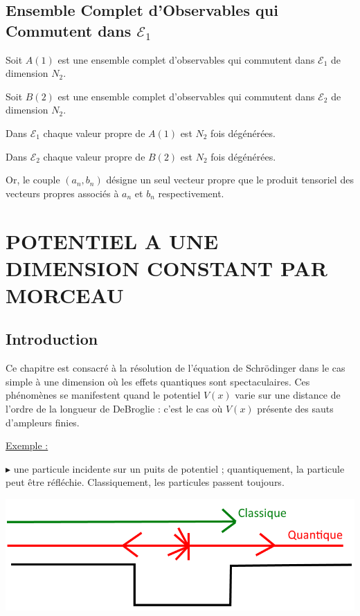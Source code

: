 \documentclass[12pt,a4paper,titlepage]{book}
\begin{document}
\section{Ensemble Complet d'Observables qui Commutent dans $\mathcal{E}_1$}

Soit $A(1)$ est une ensemble complet d'observables qui commutent dans $\mathcal{E}_1$ de dimension $N_2$.

Soit $B(2)$ est une ensemble complet d'observables qui commutent dans $\mathcal{E}_2$ de dimension $N_2$.

Dans $\mathcal{E}_1$ chaque valeur propre de $A(1)$ est $N_2$ fois dégénérées.

Dans $\mathcal{E}_2$ chaque valeur propre de $B(2)$ est $N_2$ fois dégénérées.

Or, le couple $(a_n, b_n)$ désigne un seul vecteur propre que le produit tensoriel des vecteurs propres associés à $a_n$ et $b_n$ respectivement.

\chapter{POTENTIEL A UNE DIMENSION CONSTANT PAR MORCEAU}

\section{Introduction}

Ce chapitre est consacré à la résolution de l'équation de Schrödinger dans le cas simple à une dimension où les effets quantiques sont spectaculaires. Ces phénomènes se manifestent quand le potentiel $V(x)$ varie sur une distance de l'ordre de la longueur de DeBroglie : c'est le cas où $V(x)$ présente des sauts d'ampleurs finies.

\underline{Exemple :}

$\blacktriangleright$ une particule incidente sur un puits de potentiel ; quantiquement, la particule peut être réfléchie. Classiquement, les particules passent toujours.

\begin{center}
\includegraphics[scale=0.3]{6-1-puits-de-potentiel-ok.png}
\end{center}
\end{document}

